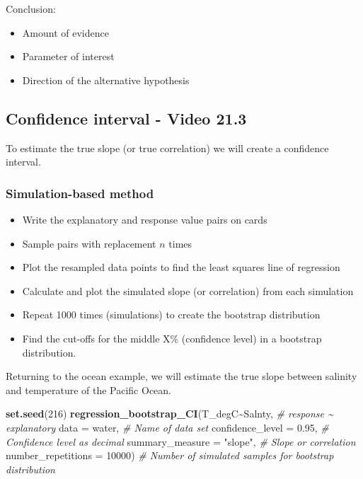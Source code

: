 \documentclass[
]{report}
\newenvironment{Shaded}{\begin{snugshade}}{\end{snugshade}}
\newcommand{\AttributeTok}[1]{\textcolor[rgb]{0.13,0.29,0.53}{#1}}
\newcommand{\CommentTok}[1]{\textcolor[rgb]{0.56,0.35,0.01}{\textit{#1}}}
\newcommand{\DecValTok}[1]{\textcolor[rgb]{0.00,0.00,0.81}{#1}}
\newcommand{\FloatTok}[1]{\textcolor[rgb]{0.00,0.00,0.81}{#1}}
\newcommand{\FunctionTok}[1]{\textcolor[rgb]{0.13,0.29,0.53}{\textbf{#1}}}
\newcommand{\NormalTok}[1]{#1}
\newcommand{\SpecialCharTok}[1]{\textcolor[rgb]{0.81,0.36,0.00}{\textbf{#1}}}
\newcommand{\StringTok}[1]{\textcolor[rgb]{0.31,0.60,0.02}{#1}}
\begin{document}
\vspace{0.8in}

Conclusion:

\begin{itemize}
\item
  Amount of evidence
\item
  Parameter of interest
\item
  Direction of the alternative hypothesis
\end{itemize}

\vspace{0.6in}

\subsection*{Confidence interval - Video 21.3}\label{confidence-interval---video-21.3}

To estimate the true slope (or true correlation) we will create a confidence interval.

\subsubsection*{Simulation-based method}\label{simulation-based-method-10}

\begin{itemize}
\item
  Write the explanatory and response value pairs on cards
\item
  Sample pairs with replacement \(n\) times
\item
  Plot the resampled data points to find the least squares line of regression
\item
  Calculate and plot the simulated slope (or correlation) from each simulation
\item
  Repeat 1000 times (simulations) to create the bootstrap distribution
\item
  Find the cut-offs for the middle X\% (confidence level) in a bootstrap distribution.
\end{itemize}

Returning to the ocean example, we will estimate the true slope between salinity and temperature of the Pacific Ocean.

\begin{Shaded}
\begin{Highlighting}[]
\FunctionTok{set.seed}\NormalTok{(}\DecValTok{216}\NormalTok{)}
\FunctionTok{regression\_bootstrap\_CI}\NormalTok{(T\_degC}\SpecialCharTok{\textasciitilde{}}\NormalTok{Salnty, }\CommentTok{\# response \textasciitilde{} explanatory}
   \AttributeTok{data =}\NormalTok{ water, }\CommentTok{\# Name of data set}
   \AttributeTok{confidence\_level =} \FloatTok{0.95}\NormalTok{, }\CommentTok{\# Confidence level as decimal}
   \AttributeTok{summary\_measure =} \StringTok{"slope"}\NormalTok{, }\CommentTok{\# Slope or correlation}
   \AttributeTok{number\_repetitions =} \DecValTok{10000}\NormalTok{) }\CommentTok{\# Number of simulated samples for bootstrap distribution}
\end{Highlighting}
\end{Shaded}
\end{document}
